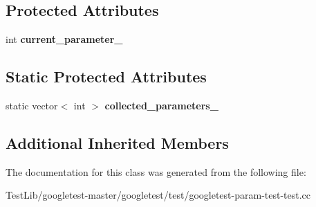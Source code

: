 \subsection*{Protected Attributes}
\begin{DoxyCompactItemize}
\item 
\mbox{\label{classTestGenerationTest_a2d149b987b6dfe86ffbfae677199b0cd}} 
int {\bfseries current\+\_\+parameter\+\_\+}
\end{DoxyCompactItemize}
\subsection*{Static Protected Attributes}
\begin{DoxyCompactItemize}
\item 
\mbox{\label{classTestGenerationTest_a16dfa6f4b445c7e4a7a9611b34b7a7a2}} 
static vector$<$ int $>$ {\bfseries collected\+\_\+parameters\+\_\+}
\end{DoxyCompactItemize}
\subsection*{Additional Inherited Members}


The documentation for this class was generated from the following file\+:\begin{DoxyCompactItemize}
\item 
Test\+Lib/googletest-\/master/googletest/test/googletest-\/param-\/test-\/test.\+cc\end{DoxyCompactItemize}
